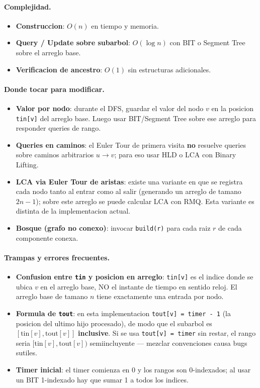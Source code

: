 \paragraph{Complejidad.}
\begin{itemize}\setlength\itemsep{0pt}
	\item \textbf{Construccion}: $O(n)$ en tiempo y memoria.
	\item \textbf{Query / Update sobre subarbol}: $O(\log n)$ con BIT o Segment Tree sobre el arreglo base.
	\item \textbf{Verificacion de ancestro}: $O(1)$ sin estructuras adicionales.
\end{itemize}

\paragraph{Donde tocar para modificar.}
\begin{itemize}\setlength\itemsep{0pt}
	\item \textbf{Valor por nodo}: durante el DFS, guardar el valor del nodo $v$ en la posicion \verb|tin[v]| del arreglo base. Luego usar BIT/Segment Tree sobre ese arreglo para responder queries de rango.
	\item \textbf{Queries en caminos}: el Euler Tour de primera visita \textbf{no} resuelve queries sobre caminos arbitrarios $u \to v$; para eso usar HLD o LCA con Binary Lifting.
	\item \textbf{LCA via Euler Tour de aristas}: existe una variante en que se registra cada nodo tanto al entrar como al salir (generando un arreglo de tamano $2n - 1$); sobre este arreglo se puede calcular LCA con RMQ. Esta variante es distinta de la implementacion actual.
	\item \textbf{Bosque (grafo no conexo)}: invocar \verb|build(r)| para cada raiz $r$ de cada componente conexa.
\end{itemize}

\paragraph{Trampas y errores frecuentes.}
\begin{itemize}\setlength\itemsep{0pt}
	\item \textbf{Confusion entre \texttt{tin} y posicion en arreglo}: \verb|tin[v]| es el indice donde se ubica $v$ en el arreglo base, NO el instante de tiempo en sentido reloj. El arreglo base de tamano $n$ tiene exactamente una entrada por nodo.
	\item \textbf{Formula de \texttt{tout}}: en esta implementacion \verb|tout[v] = timer - 1| (la posicion del ultimo hijo procesado), de modo que el subarbol es $[\text{tin}[v], \text{tout}[v]]$ \textbf{inclusive}. Si se usa \verb|tout[v] = timer| sin restar, el rango seria $[\text{tin}[v], \text{tout}[v])$ semiincluyente --- mezclar convenciones causa bugs sutiles.
	\item \textbf{Timer inicial}: el timer comienza en 0 y los rangos son 0-indexados; al usar un BIT 1-indexado hay que sumar 1 a todos los indices.
\end{itemize}


